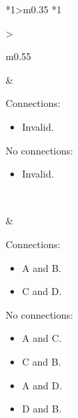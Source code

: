 \documentclass[../../main]{subfiles}
\begin{document}
\begin{center}
\begin{xltabular} {\textwidth} {
            *{1}{>{\centering\arraybackslash}m{0.35\linewidth}}
            *{1}{>{\raggedright\arraybackslash}m{0.55\linewidth}}
        }
        &
        {\begin{minipage} [t] {0.4\linewidth}
            Connections:
            \begin{itemize}
                \setlength\itemsep{1pt}
                \item Invalid.
            \end{itemize}
        \end{minipage}
        \hfill
        \begin{minipage} [t] {0.4\linewidth}
            No connections:
            \begin{itemize}
                \setlength\itemsep{1pt}
                \item Invalid.
            \end{itemize}
        \end{minipage}}

        \\ \midrule

        &

        {\begin{minipage} [t] {0.4\linewidth}
            Connections:
            \begin{itemize}
                \setlength\itemsep{1pt}
                \item A and B.
                \item C and D.
            \end{itemize}
        \end{minipage}
        \hfill
        \begin{minipage} [t] {0.4\linewidth}
            No connections:
            \begin{itemize}
                \setlength\itemsep{1pt}
                \item A and C.
                \item C and B.
                \item A and D.
                \item D and B.
            \end{itemize}
        \end{minipage}}


\end{xltabular}
\end{center}
\end{document}
